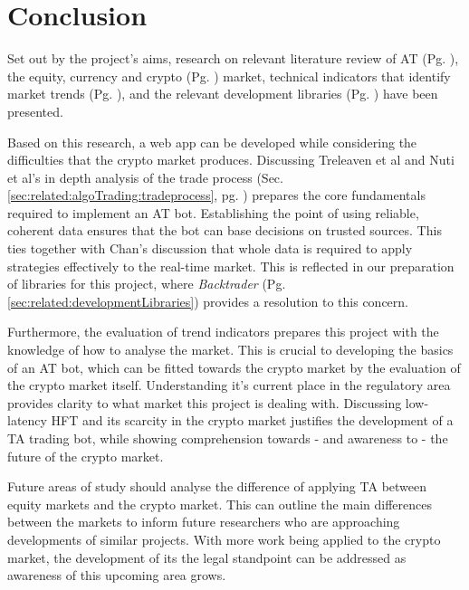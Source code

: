 \section{Conclusion}
\label{sec:related:conclusion}


\noindent Set out by the project's aims, research on relevant literature review of AT (Pg. \pageref{sec:related:algoTrading}), the equity, currency and crypto (Pg. \pageref{sec:related:cryptoAndTheirMarkets}) market, technical indicators that identify market trends (Pg. \pageref{sec:related:tradingStrategies}), and the relevant development libraries (Pg. \pageref{sec:related:developmentLibraries}) have been presented. 

Based on this research, a web app can be developed while considering the difficulties that the crypto market produces. Discussing Treleaven et al \cite{ART:Treleaven:2013} and Nuti et al's \cite{ART:Nuti:2011} in depth analysis of the trade process (Sec. \ref{sec:related:algoTrading:tradeprocess}, pg. \pageref{sec:related:algoTrading:tradeprocess}) prepares the core fundamentals required to implement an AT bot. Establishing the point of using reliable, coherent data ensures that the bot can base decisions on trusted sources. This ties together with Chan's \cite{BOOK:Chan:2013} discussion that whole data is required to apply strategies effectively to the real-time market. This is reflected in our preparation of libraries for this project, where \textit{Backtrader} (Pg. \ref{sec:related:developmentLibraries}) provides a resolution to this concern. 

Furthermore, the evaluation of trend indicators prepares this project with the knowledge of how to analyse the market. This is crucial to developing the basics of an AT bot, which can be fitted towards the crypto market by the evaluation of the crypto market itself. Understanding it's current place in the regulatory area provides clarity to what market this project is dealing with. Discussing  low-latency HFT and its scarcity in the crypto market justifies the development of a TA trading bot, while showing comprehension towards - and awareness to - the future of the crypto market.

Future areas of study should analyse the difference of applying TA between equity markets and the crypto market. This can outline the main differences between the markets to inform future researchers who are approaching developments of similar projects. With more work being applied to the crypto market, the development of its the legal standpoint can be addressed as awareness of this upcoming area grows.




